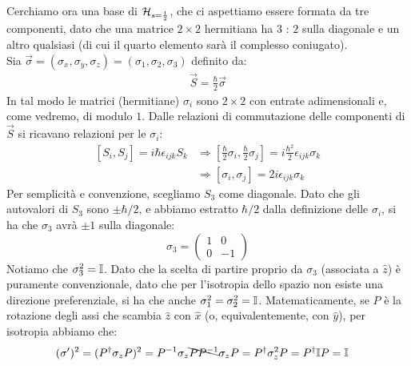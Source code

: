 \documentclass[../../FisicaTeorica.tex]{subfiles}
\begin{document}
Cerchiamo ora una base di $\mathcal{H}_{s=\frac{1}{2}}$, che ci aspettiamo essere formata da tre componenti, dato che una matrice $2\times 2$ hermitiana ha $3$ : $2$ sulla diagonale e un altro qualsiasi (di cui il quarto elemento sarà il complesso coniugato).\\
Sia $\vec{\sigma}=(\sigma_x, \sigma_y, \sigma_z)=(\sigma_1, \sigma_2, \sigma_3)$ definito da:
\begin{align*}
\vec{S}=\frac{\hbar}{2}\vec{\sigma}
\end{align*}
In tal modo le matrici (hermitiane) $\sigma_i$ sono $2\times 2$ con entrate adimensionali e, come vedremo, di modulo $1$. Dalle relazioni di commutazione delle componenti di $\vec{S}$ si ricavano relazioni per le $\sigma_i$:
\begin{align}\nonumber
[S_i, S_j] = i\hbar \epsilon_{ijk}S_k &\Rightarrow  \left[\frac{\hbar}{2}\sigma_i, \frac{\hbar}{2}\sigma_j \right] = i\frac{\hbar^2}{2}\epsilon_{ijk}\sigma_k\\
&\Rightarrow [\sigma_i, \sigma_j]=2i\epsilon_{ijk}\sigma_k \label{eqn:commutazione-sigma}
\end{align}
Per semplicità e convenzione, scegliamo $S_3$ come diagonale. Dato che gli autovalori di $S_3$ sono $\pm \hbar/2$, e abbiamo estratto $\hbar/2$ dalla definizione delle $\sigma_i$, si ha che $\sigma_3$ avrà $\pm 1$ sulla diagonale:
\[
\sigma_3 = \begin{pmatrix}
1 & 0\\
0 & -1
\end{pmatrix}
\]
Notiamo che $\sigma_3^2 = \mathbb{I}$. Dato che la scelta di partire proprio da $\sigma_3$ (associata a $\hat{z}$) è puramente convenzionale, dato che per l'isotropia dello spazio non esiste una direzione preferenziale, si ha che anche $\sigma_1^2 = \sigma_2^2 = \mathbb{I}$. Matematicamente, se $P$ è la rotazione degli assi che scambia $\hat{z}$ con $\hat{x}$ (o, equivalentemente, con $\hat{y}$), per isotropia abbiamo che:
\begin{align*}
(\sigma')^2 =(P^\dag \sigma_z P)^2 &= P^{-1}\sigma_z \bcancel{PP^{-1}}\sigma_z P = P^\dag \sigma_z^2 P = P^\dag \mathbb{I}P=\mathbb{I}
\end{align*}
\end{document}
